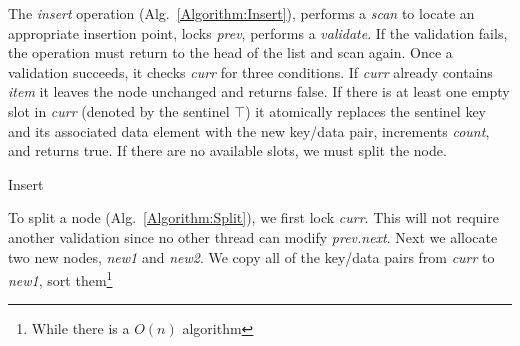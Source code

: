\documentclass{llncs}
\begin{document}
{The {\em insert} operation (Alg.~{\ref{Algorithm:Insert}}),
performs a {\em scan} to locate an appropriate insertion point, locks
{\em prev}, performs a {\em validate}.  If the validation fails, the operation must return to the head of the list and scan again.
Once a validation succeeds, it checks {\em curr} for three conditions.  If 
{\em curr} already contains {\em item} it leaves the node unchanged
and returns {\sc false}.  If there is at least one empty slot in {\em curr}
(denoted by the sentinel $\top$) it atomically replaces the sentinel key and its 
associated data element with the new key/data pair, increments {\em count}, and returns {\sc true}.   
If there are no available slots, we must split the node.
\begin{algorithm}
\DontPrintSemicolon
{}
\caption{Insert}
\label{Algorithm:Insert}
\end{algorithm}
To split a node (Alg.~{\ref{Algorithm:Split}}), we first lock {\em curr}.  
This will not require another validation since no other thread can modify {\em prev.next}. 
Next we allocate two new nodes, {\em new1} and
{\em new2}.  We copy all of the key/data pairs from {\em curr} to {\em new1}, sort 
them\footnote{While there is a $O(n)$ algorithm
}}
\end{document}
